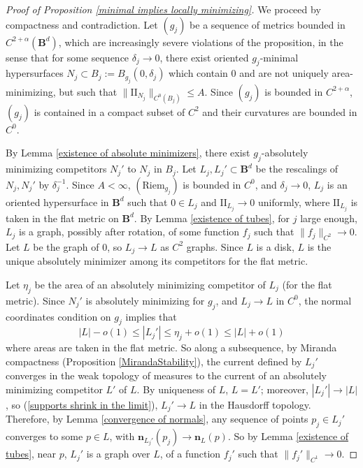 \documentclass[reqno,11pt]{amsart}
\newcommand{\Ball}{\mathbf{B}}
\newcommand{\Two}{\mathrm{I\!I}}
\newcommand{\normal}{\mathbf n}
\newcommand{\Riem}{\mathrm{Riem}}
\theoremstyle{definition}
\numberwithin{equation}{section}
\begin{document}
\begin{proof}[Proof of Proposition \ref{minimal implies locally minimizing}]
We proceed by compactness and contradiction.
Let $(g_j)$ be a sequence of metrics bounded in $C^{2 + \alpha}(\Ball^d)$, which are increasingly severe violations of the proposition, in the sense that for some sequence $\delta_j \to 0$, there exist oriented $g_j$-minimal hypersurfaces $N_j \subset B_j := B_{g_j}(0, \delta_j)$ which contain $0$ and are not uniquely area-minimizing, but such that $\|\Two_{N_j}\|_{C^0(B_j)} \leq A$.
Since $(g_j)$ is bounded in $C^{2 + \alpha}$, $(g_j)$ is contained in a compact subset of $C^2$ and their curvatures are bounded in $C^0$.


By Lemma \ref{existence of absolute minimizers}, there exist $g_j$-absolutely minimizing competitors $N_j'$ to $N_j$ in $B_j$.
Let $L_j, L_j' \subset \Ball^d$ be the rescalings of $N_j, N_j'$ by $\delta_j^{-1}$.
Since $A < \infty$, $(\Riem_{g_j})$ is bounded in $C^0$, and $\delta_j \to 0$, $L_j$ is an oriented hypersurface in $\Ball^d$ such that $0 \in L_j$ and $\Two_{L_j} \to 0$ uniformly, where $\Two_{L_j}$ is taken in the flat metric on $\Ball^d$.
By Lemma \ref{existence of tubes}, for $j$ large enough, $L_j$ is a graph, possibly after rotation, of some function $f_j$ such that $\|f_j\|_{C^2} \to 0$.
Let $L$ be the graph of $0$, so $L_j \to L$ as $C^2$ graphs.
Since $L$ is a disk, $L$ is the unique absolutely minimizer among its competitors for the flat metric.

Let $\eta_j$ be the area of an absolutely minimizing competitor of $L_j$ (for the flat metric).
Since $N_j'$ is absolutely minimizing for $g_j$, and $L_j \to L$ in $C^0$, the normal coordinates condition on $g_j$ implies that
$$|L| - o(1) \leq |L_j'| \leq \eta_j + o(1) \leq |L| + o(1)$$
where areas are taken in the flat metric.
So along a subsequence, by Miranda compactness (Proposition \ref{MirandaStability}), the current defined by $L_j'$ converges in the weak topology of measures to the current of an absolutely minimizing competitor $L'$ of $L$.
By uniqueness of $L$, $L = L'$; moreover, $|L_j'| \to |L|$, so (\ref{supports shrink in the limit}), $L_j' \to L$ in the Hausdorff topology.
Therefore, by Lemma \ref{convergence of normals}, any sequence of points $p_j \in L_j'$ converges to some $p \in L$, with $\normal_{L_j'}(p_j) \to \normal_L(p)$.
So by Lemma \ref{existence of tubes}, near $p$, $L_j'$ is a graph over $L$, of a function $f_j'$ such that $\|f_j'\|_{C^1} \to 0$.


\end{proof}
\end{document}

